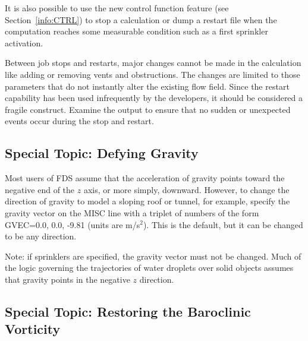 \documentclass[11pt]{book}
\begin{document}
It is also possible to use the new control function feature (see Section~\ref{info:CTRL})
to stop a calculation or dump a restart file when the computation reaches
some measurable condition such as a first sprinkler activation.

Between job stops and restarts, major changes cannot be made in the calculation
like adding or removing vents and obstructions. The changes are limited to those parameters that do
not instantly alter the existing flow field. Since the restart
capability has been used infrequently by the developers, it should be considered
a fragile construct. Examine the output
to ensure that no sudden or unexpected events occur during the stop and
restart.


\subsection{Special Topic: Defying Gravity}
\label{info:GVEC}

Most users of FDS assume that the acceleration of gravity points toward
the negative end of the $z$ axis, or more simply, downward.
However, to change the direction of gravity to model
a sloping roof or tunnel, for example, specify the gravity
vector on the {\ct MISC} line with a triplet of numbers of the form
{\ct GVEC=0.0, 0.0, -9.81} (units are m/s$^2$). This is the default, but it
can be changed to be any direction.

Note: if sprinklers are specified, the gravity vector must not be
changed. Much of the logic governing the trajectories of water droplets
over solid objects assumes that gravity points in the negative $z$
direction.


\subsection{Special Topic: Restoring the Baroclinic Vorticity}
\end{document}
